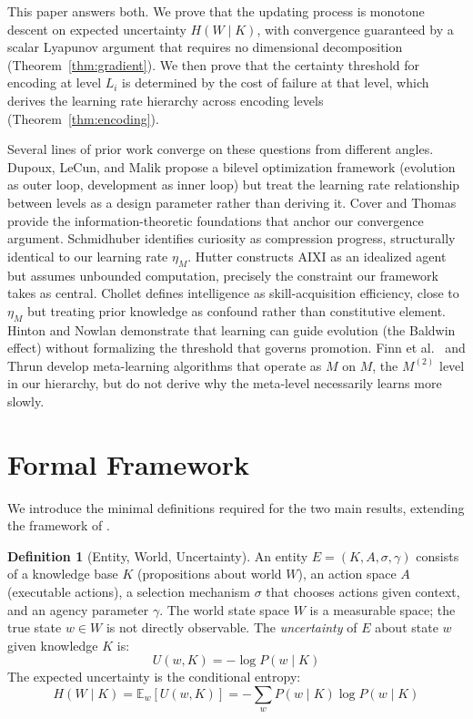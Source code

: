 \documentclass[11pt]{article}
\theoremstyle{definition}
\newtheorem{definition}{Definition}
\begin{document}
This paper answers both. We prove that the updating process is
monotone descent on expected uncertainty $H(W \mid K)$, with
convergence guaranteed by a scalar Lyapunov argument that requires no
dimensional decomposition (Theorem~\ref{thm:gradient}). We then prove that the certainty
threshold for encoding at level $L_i$ is determined by the cost of
failure at that level, which derives the learning rate hierarchy across
encoding levels (Theorem~\ref{thm:encoding}).

Several lines of prior work converge on these questions from different
angles. Dupoux, LeCun, and Malik \cite{DupouxLeCunMalik2026} propose
a bilevel optimization framework (evolution as outer loop, development
as inner loop) but treat the learning rate relationship between levels
as a design parameter rather than deriving it. Cover and Thomas
\cite{Cover2006} provide the information-theoretic foundations that
anchor our convergence argument. Schmidhuber \cite{Schmidhuber2010} identifies
curiosity as compression progress, structurally identical to our
learning rate $\eta_M$. Hutter \cite{Hutter2005} constructs AIXI as
an idealized agent but assumes unbounded computation, precisely the
constraint our framework takes as central. Chollet
\cite{Chollet2019} defines intelligence as skill-acquisition
efficiency, close to $\eta_M$ but treating prior knowledge as
confound rather than constitutive element. Hinton and Nowlan
\cite{Hinton1987} demonstrate that learning can guide evolution (the
Baldwin effect) without formalizing the threshold that governs
promotion. Finn et al.\ \cite{FinnEtAl2017} and Thrun
\cite{Thrun1998} develop meta-learning algorithms that operate as $M$
on $M$, the $M^{(2)}$ level in our hierarchy, but do not derive
why the meta-level necessarily learns more slowly.

\section{Formal Framework}
\label{sec:framework}

We introduce the minimal definitions required for the two main
results, extending the framework of \cite{McCarthy2026a}.

\begin{definition}[Entity, World, Uncertainty]
\label{def:entity}
An entity $E = (K, A, \sigma, \gamma)$ consists of a knowledge base $K$
(propositions about world $W$), an action space $A$ (executable
actions), a selection mechanism $\sigma$ that chooses actions given
context, and an agency parameter $\gamma$. The world state space $W$ is a
measurable space; the true state $w \in W$ is not directly observable.
The \emph{uncertainty} of $E$ about state $w$ given knowledge $K$ is:
\[
U(w, K) = -\log P(w \mid K)
\]
The expected uncertainty is the conditional entropy:
\[
H(W \mid K) = \mathbb{E}_w[U(w, K)] = -\sum_w P(w \mid K) \log P(w \mid K)
\]
\end{definition}
\end{document}
